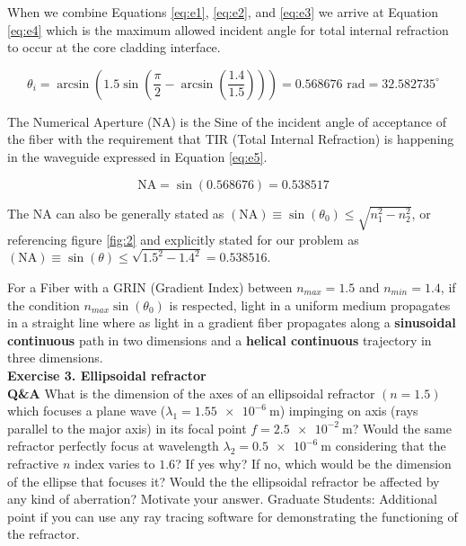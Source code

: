 \documentclass[main.tex]{subfiles}
\begin{document}
When we combine Equations \ref{eq:e1}, \ref{eq:e2}, and \ref{eq:e3} we arrive at Equation \ref{eq:e4} which is the maximum allowed incident angle for total internal refraction to occur at the core cladding interface.

\begin{equation}\label{eq:e4}
\theta_i = \arcsin(1.5\sin(\frac{\pi}{2} - \arcsin(\frac{1.4}{1.5}))) = 0.568676 \text{ rad} = 32.582735^{\circ}
\end{equation}

The Numerical Aperture (NA) is the Sine of the incident angle of acceptance of the fiber with the requirement that TIR (Total Internal Refraction) is happening in the waveguide expressed in Equation \ref{eq:e5}. 

\begin{equation}\label{eq:e5}
\text{NA} = \sin(0.568676) = 0.538517
\end{equation}

The NA can also be generally stated as $(\text{NA}) \equiv \sin(\theta_0) \leq \sqrt{n_1^2 - n_2^2}$, or referencing figure \ref{fig:2} and explicitly stated for our problem as $(\text{NA}) \equiv \sin(\theta) \leq \sqrt{1.5^2 - 1.4^2} = 0.538516 $. 

For a Fiber with a GRIN (Gradient Index) between $n_{max} = 1.5$ and $n_{min} = 1.4$, if the condition $n_{max}\sin(\theta_0)$ is respected, light in a uniform medium propagates in a straight line where as light in a gradient fiber propagates along a \textbf{sinusoidal continuous} path in two dimensions and a \textbf{helical continuous} trajectory in three dimensions.\\

\textbf{Exercise 3. Ellipsoidal refractor}\\
\textbf{Q\&A} What is the dimension of the axes of an ellipsoidal refractor $(n=1.5)$ which focuses a plane wave ($\lambda_1 = \SI{1.55e-6}{\meter}$) impinging on axis (rays parallel to the major axis) in its focal point $f =  \SI{2.5e-2}{\meter}$? Would the same refractor perfectly focus at wavelength $\lambda_2 = \SI{0.5e-6}{\meter}$ considering that the refractive $n$ index varies to $1.6$? If yes why? If no, which would be the dimension of the ellipse that focuses it? Would the the ellipsoidal refractor be affected by any kind of aberration? Motivate your answer. Graduate Students: Additional point if you can use any ray tracing software for demonstrating the functioning of the refractor.\\
\end{document}
